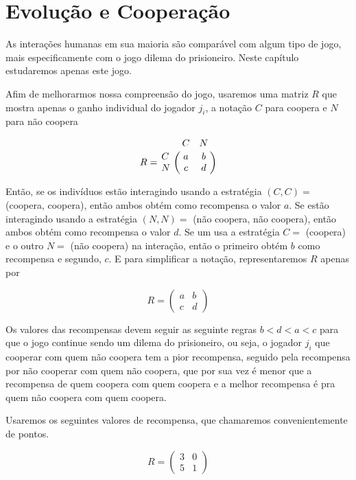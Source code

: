 %

\chapter{Evolução e Cooperação}

As interações humanas em sua maioria são comparável com algum tipo de jogo, mais especificamente com o jogo dilema do prisioneiro. Neste capítulo estudaremos apenas este jogo. 

Afim de melhorarmos nossa compreensão do jogo, usaremos uma matriz $R$ que mostra apenas o ganho individual do jogador $j_i$, a notação $C$ para coopera e $N$ para não coopera

\begin{equation}\nonumber
R=\bordermatrix{
&C&N\cr
C&a& b \cr
N &c&d
}
\end{equation}\vspace{0.1cm}

Então, se os indivíduos estão interagindo usando a estratégia $(C,C)=$ (coopera, coopera), então ambos obtém como recompensa o valor $a$. Se estão interagindo usando a estratégia $(N,N)=$ (não coopera, não coopera), então ambos obtém como recompensa o valor $d$. Se um usa a estratégia $C =$ (coopera) e o outro $N=$ (não coopera) na interação, então o primeiro obtém $b$ como recompensa e segundo, $c$. E para simplificar a notação, representaremos $R$ apenas por 

\begin{equation}\nonumber
R=\begin{pmatrix}
a & b\\c & d
\end{pmatrix}
\end{equation}\vspace{0.1cm}

Os valores das recompensas devem seguir as seguinte regras $b<d<a<c$ para que o jogo continue sendo um dilema do prisioneiro, ou seja, o jogador $j_i$ que cooperar com quem não coopera tem a pior recompensa, seguido pela recompensa por não cooperar com quem não coopera, que por sua vez é menor que a recompensa de quem coopera com quem coopera e a melhor recompensa é pra quem não coopera com quem coopera.

Usaremos os seguintes valores de recompensa, que chamaremos convenientemente de pontos.

\begin{equation}\nonumber
R=\begin{pmatrix}
3 & 0\\5 & 1
\end{pmatrix}
\end{equation}\vspace{0.1cm}

